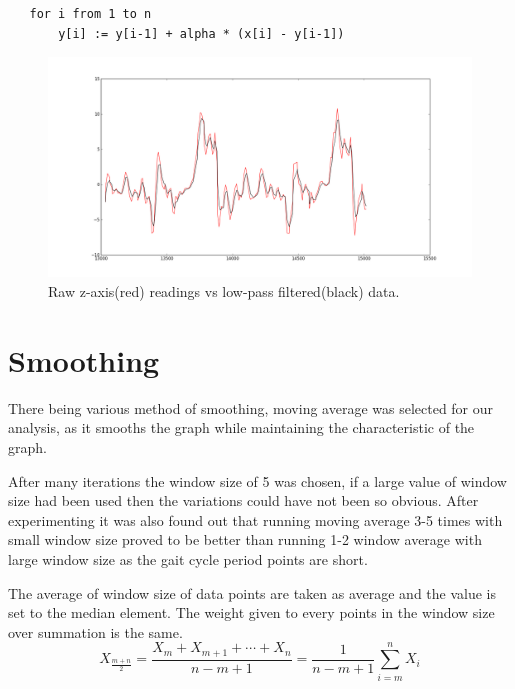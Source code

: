 \documentclass[a4paper]{report}
\begin{document}
\begin{verbatim}
   for i from 1 to n
       y[i] := y[i-1] + alpha * (x[i] - y[i-1])
\end{verbatim}

\begin{figure}
\includegraphics[scale=0.3]{pictures/LOWPASSfiltereddata.png}
\caption{Raw z-axis(red) readings vs low-pass filtered(black) data.}
\end{figure}


\section{Smoothing}
There being various method of smoothing, moving average was selected for our analysis, as it smooths the graph while maintaining the characteristic of the graph.\cite{ma} \newline

After many iterations the window size of 5 was chosen, if a large value of window size had been used then the variations could have not been so obvious. After experimenting it was also found out that running moving average 3-5 times with small window size proved to be better than running 1-2 window average with large window size as the gait cycle period points are short. \newline


The average of window size of data points are taken as average and the value is set to the median element. The weight given to every points in the window size over summation is the same.\newline
$$X_\frac{m+n}{2} = \frac{X_m + X_{m+1}+ \cdots + X_n}{n-m+1}
      = \frac{1}{n-m+1}\sum_{i=m}^{n} X_i$$
\end{document}
